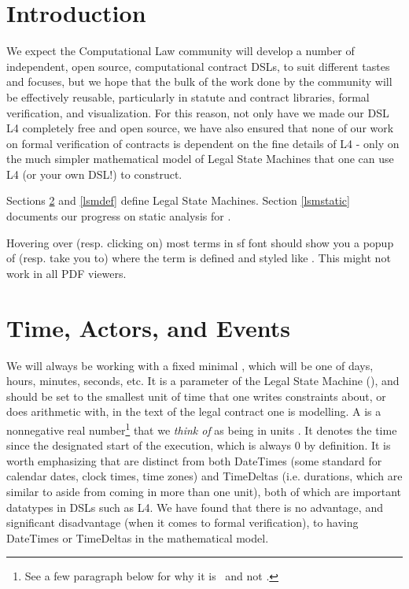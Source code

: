 \documentclass[12pt]{article}
\newcommand{\term}[1]{\EM{\textsf{\hyperref[#1]{#1}}}\xspace}
\newcommand{\termz}[2]{\EM{\textsf{\hyperref[#1]{#2}}}\xspace}
\newcommand{\lsm}{\term{LSM}}
\newcommand{\lsms}{\termz{LSM}{LSMs}}
\newcommand{\timeunit}{\term{timeunit}}
\newcommand{\timestamps}{\termz{timestamp}{timestamps}}
\newcommand{\TS}{\EM{\mathbb{\hyperref[TS]{T}}}\xsapce}
\begin{document}
\tableofcontents


\section{Introduction}

We expect the Computational Law community will develop a number of independent, open source, computational contract DSLs, to suit different tastes and focuses, but we hope that the bulk of the work done by the community will be effectively reusable, particularly in statute and contract libraries, formal verification, and visualization. For this reason, not only have we made our DSL L4 completely free and open source, we have also ensured that none of our work on formal verification of contracts is dependent on the fine details of L4 - only on the much simpler mathematical model of Legal State Machines that one can use L4 (or your own DSL!) to construct.

Sections \ref{basics} and \ref{lsmdef} define Legal State Machines. Section \ref{lsmstatic} documents our progress on static analysis for \lsms.

Hovering over (resp. clicking on) most terms in \textsf{{sf font}} should show you a popup of (resp. take you to)  where the term is defined and styled like . This might not work in all PDF viewers.


\section{Time, Actors, and Events} \label{basics}
We will always be working with a fixed minimal , which will be one of days, hours, minutes, seconds, etc. It is a parameter of the Legal State Machine (\lsm), and should be set to the smallest unit of time that one writes constraints about, or does arithmetic with, in the text of the legal contract one is modelling.  A  is  a nonnegative real number\footnote{See a few paragraph below for why it is \RR\, and not \NN.} that we \textit{think of} as being in units \timeunit. It denotes the time since the designated start of the \lsm execution, which is always 0 by definition.
It is worth emphasizing that \timestamps are distinct from both DateTimes (some standard for calendar dates, clock times, time zones) and TimeDeltas (i.e. durations, which are similar to \timeunit aside from coming in more than one unit), both of which are important datatypes in DSLs such as L4. We have found that there is no advantage, and significant disadvantage (when it comes to formal verification), to having DateTimes or TimeDeltas in the mathematical model.
\end{document}
